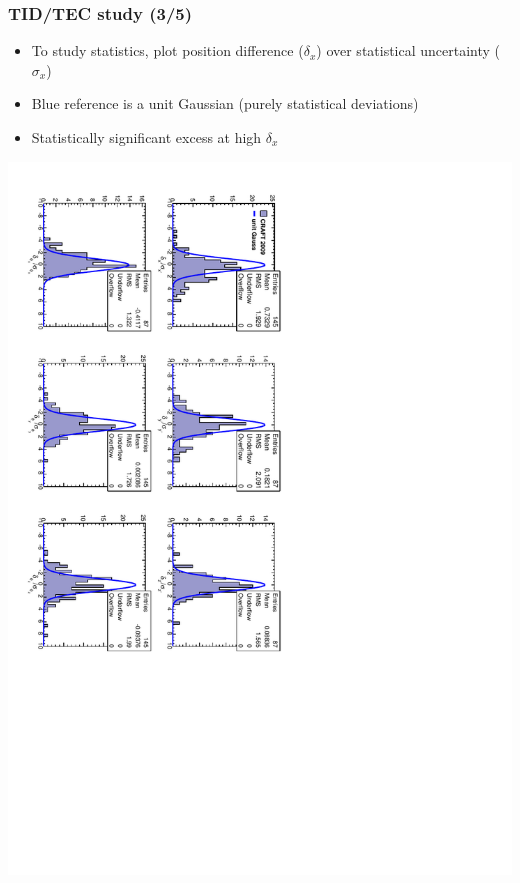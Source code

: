 \documentclass[compress]{beamer}
\begin{document}
\begin{frame}
\frametitle{TID/TEC study (3/5)}
\begin{itemize}
\item To study statistics, plot position difference ($\delta_x$) over
  statistical uncertainty ($\sigma_x$)
\item Blue reference is a unit Gaussian (purely statistical deviations)
\item Statistically significant excess at high $\delta_x$
\end{itemize}

\includegraphics[height=\linewidth, angle=90]{tecnorm.pdf}
\end{frame}
\end{document}
